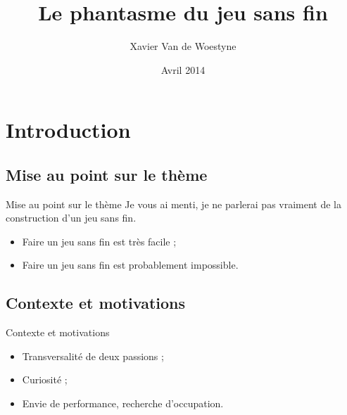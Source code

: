 \documentclass{beamer}
\title[Le phantasme du jeu sans fin]{Le phantasme du jeu sans fin}
\author{Xavier Van de Woestyne}
\date{Avril 2014}
\begin{document}
\begin{frame}
\titlepage
\end{frame}


\section{Introduction}

\subsection{Mise au point sur le thème}
\begin{frame}{Mise au point sur le thème}
  Je vous ai menti, je ne parlerai pas vraiment de la construction d'un jeu sans fin.\newline \newline
  \begin{itemize}
    \item Faire un jeu sans fin est très facile ;
    \item Faire un jeu sans fin est probablement impossible.
  \end{itemize}
\end{frame}

\subsection{Contexte et motivations}
\begin{frame}{Contexte et motivations}
  \begin{itemize}
    \item Transversalité de deux passions ;
    \item Curiosité ;
    \item Envie de performance, recherche d'occupation.
  \end{itemize}
\end{frame}
\end{document}
